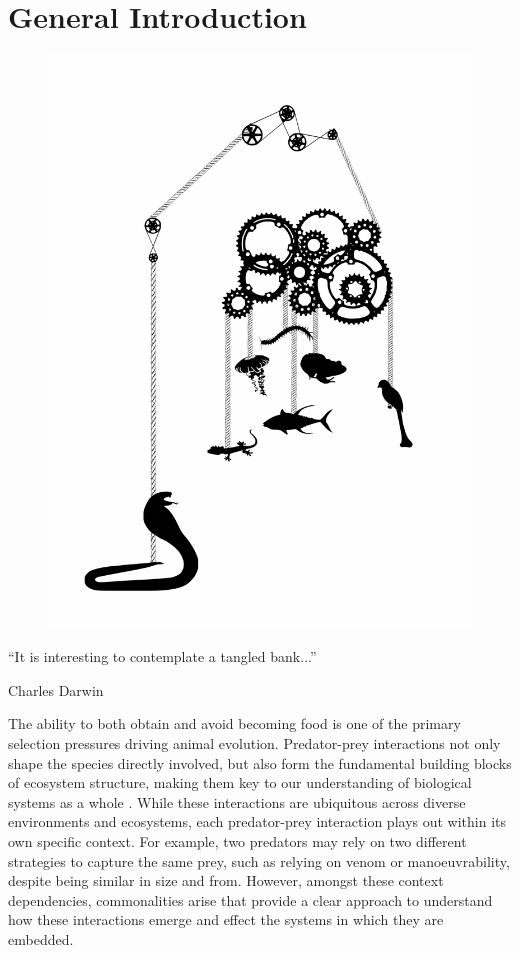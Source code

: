\chapter{General Introduction}
\label{chap:introduction}


\begin{figure}[h]
  \centering
  \includegraphics[width=.55\textwidth]{ch1-introduction/snake_complexity.pdf}
\end{figure}

\begin{quoteshrink}
  ``It is interesting to contemplate a tangled bank...''

\hfill{Charles Darwin}
\end{quoteshrink}


\noindent
The ability to both obtain and avoid becoming food is one of the primary selection pressures driving animal evolution. Predator-prey interactions not only shape the species directly involved, but also form the fundamental building blocks of ecosystem structure, making them key to our understanding of biological systems as a whole \citep{pimm1984complexity,cohen1990community}. While these interactions are ubiquitous across diverse environments and ecosystems, each predator-prey interaction plays out within its own specific context. For example, two predators may rely on two different strategies to capture the same prey, such as relying on venom or manoeuvrability, despite being similar in size and from. However, amongst these context dependencies, commonalities arise that provide a clear approach to understand how these interactions emerge and effect the systems in which they are embedded.


